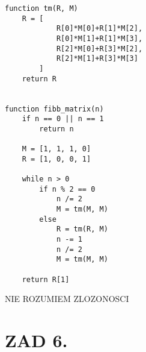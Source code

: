 \documentclass{article}[13pt]
\begin{document}
\begin{lstlisting}[language=juleczka]
function tm(R, M)
    R = [
            R[0]*M[0]+R[1]*M[2], 
            R[0]*M[1]+R[1]*M[3], 
            R[2]*M[0]+R[3]*M[2], 
            R[2]*M[1]+R[3]*M[3]
        ]
    return R


function fibb_matrix(n)
    if n == 0 || n == 1
        return n
    
    M = [1, 1, 1, 0]
    R = [1, 0, 0, 1]

    while n > 0
        if n % 2 == 0
            n /= 2
            M = tm(M, M)
        else
            R = tm(R, M)
            n -= 1
            n /= 2
            M = tm(M, M)
    
    return R[1]
\end{lstlisting}

{\color{acc}NIE ROZUMIEM ZLOZONOSCI}

\section*{ZAD 6.}
\end{document}
